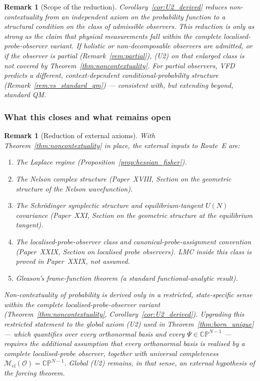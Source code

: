 \documentclass[12pt]{article}
\newtheorem{remark}[theorem]{Remark}
\newcommand{\Ocal}{\mathcal{O}}
\newcommand{\Mcl}{\mathcal{M}_{\mathrm{cl}}}
\begin{document}
\begin{remark}[Scope of the reduction]\label{rem:U2_scope}
Corollary~\ref{cor:U2_derived} reduces non-contextuality from an independent axiom on the probability function to a structural condition on the class of admissible observers. This reduction is only as strong as the claim that physical measurements fall within the complete localised-probe-observer variant. If holistic or non-decomposable observers are admitted, or if the observer is partial (Remark~\ref{rem:partial}), (U2) on that enlarged class is not covered by Theorem~\ref{thm:noncontextuality}. For partial observers, VFD predicts a different, context-dependent conditional-probability structure (Remark~\ref{rem:vs_standard_qm}) --- consistent with, but extending beyond, standard QM.
\end{remark}

\subsubsection*{What this closes and what remains open}

\begin{remark}[Reduction of external axioms]\label{rem:reduction}
With Theorem~\ref{thm:noncontextuality} in place, the external inputs to Route~E are:
\begin{enumerate}
    \item The Laplace regime (Proposition~\ref{prop:hessian_fisher}).
    \item The Nelson complex structure (Paper~XVIII, Section on the geometric structure of the Nelson wavefunction).
    \item The Schr\"odinger symplectic structure and equilibrium-tangent $U(N)$ covariance (Paper~XXI, Section on the geometric structure at the equilibrium tangent).
    \item The localised-probe-observer class and canonical-probe-assignment convention (Paper~XXIX, Section on localised probe observers). LMC inside this class is proved in Paper~XXIX, not assumed.
    \item Gleason's frame-function theorem (a standard functional-analytic result).
\end{enumerate}
Non-contextuality of probability is derived only in a restricted, state-specific sense within the complete localised-probe-observer variant (Theorem~\ref{thm:noncontextuality}, Corollary~\ref{cor:U2_derived}). Upgrading this restricted statement to the global axiom (U2) used in Theorem~\ref{thm:born_unique} --- which quantifies over every orthonormal basis and every $\Psi \in \mathbb{CP}^{N-1}$ --- requires the additional assumption that every orthonormal basis is realised by a complete localised-probe observer, together with universal completeness $\Mcl(\Ocal) = \mathbb{CP}^{N-1}$. Global (U2) remains, in that sense, an external hypothesis of the forcing theorem.
\end{remark}
\end{document}
